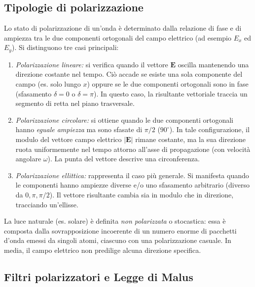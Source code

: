 \documentclass[a4paper,11pt]{report}
\begin{document}
\subsection{Tipologie di polarizzazione}

Lo stato di polarizzazione di un'onda è determinato dalla relazione di fase e di ampiezza tra le due componenti ortogonali del campo elettrico (ad esempio $E_x$ ed $E_y$). Si distinguono tre casi principali:
\begin{enumerate}
\item \textit{Polarizzazione lineare:}
si verifica quando il vettore $\bm{E}$ oscilla mantenendo una direzione costante nel tempo. Ciò accade se esiste una sola componente del campo (es. solo lungo $x$) oppure se le due componenti ortogonali sono in fase (sfasamento $\delta = 0$ o $\delta = \pi$). In questo caso, la risultante vettoriale traccia un segmento di retta nel piano trasversale.

\item \textit{Polarizzazione circolare:}
si ottiene quando le due componenti ortogonali hanno \textit{eguale ampiezza} ma sono sfasate di $\pi/2$ ($90^{\circ}$). In tale configurazione, il modulo del vettore campo elettrico $|\bm{E}|$ rimane costante, ma la sua direzione ruota uniformemente nel tempo attorno all'asse di propagazione (con velocità angolare $\omega$). La punta del vettore descrive una circonferenza.

\item \textit{Polarizzazione ellittica:}
rappresenta il caso più generale. Si manifesta quando le componenti hanno ampiezze diverse e/o uno sfasamento arbitrario (diverso da $0, \pi, \pi/2$). Il vettore risultante cambia sia in modulo che in direzione, tracciando un'ellisse.
\end{enumerate}
La luce naturale (es. solare) è definita \textit{non polarizzata} o stocastica: essa è composta dalla sovrapposizione incoerente di un numero enorme di pacchetti d'onda emessi da singoli atomi, ciascuno con una polarizzazione casuale. In media, il campo elettrico non predilige alcuna direzione specifica.

\subsection{Filtri polarizzatori e Legge di Malus}
\end{document}
